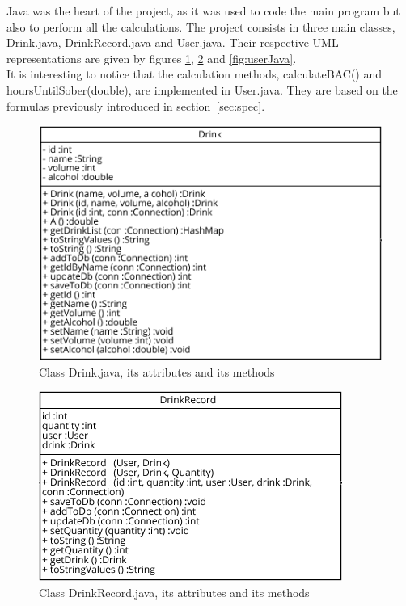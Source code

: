 Java was the heart of the project, as it was used to code the main program but also to perform all the calculations. The project consists in three main classes, Drink.java, DrinkRecord.java and User.java. Their respective UML representations are given by {\sc figures} \ref{fig:drinkJava}, \ref{fig:drinkRecordJava} and \ref{fig:userJava}.\\

It is interesting to notice that the calculation methods, calculateBAC() and hoursUntilSober(double), are implemented in User.java. They are based on the formulas previously introduced in {\sc section}~\ref{sec:spec}. 

\begin{figure}[H]
\centering
   \includegraphics{./figures/drink.png}
   \caption{Class Drink.java, its attributes and its methods}
   \label{fig:drinkJava}
\end{figure}

\begin{figure}[H]
\centering
   \includegraphics{./figures/drinkRecord.png}
   \caption{Class DrinkRecord.java, its attributes and its methods}
   \label{fig:drinkRecordJava}
\end{figure}

